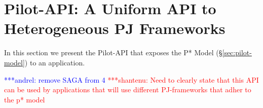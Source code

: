 \documentclass[conference,final]{IEEEtran}
\newcommand{\terminology}[1]{ {\textcolor{red} {(Terminology used: \textbf{#1}) }}}
\newcommand{\jhanote}[1]{ {\textcolor{red} { ***shantenu: #1 }}}
\newcommand{\alnote}[1]{ {\textcolor{blue} { ***andrel: #1 }}}
\newcommand{\amnote}[1]{ {\textcolor{blue} { ***andrem: #1 }}}
\newcommand{\msnote}[1]{ {\textcolor{cyan} { ***mark: #1 }}}
\newcommand{\note}[1]{ {\textcolor{magenta} { ***Note: #1 }}}
\newcommand{\terminology}[1]{}
\newcommand{\alnote}[1]{}
\newcommand{\amnote}[1]{}
\newcommand{\jhanote}[1]{}
\newcommand{\msnote}[1]{}
\newcommand{\note}[1]{}
\newcommand{\cu}{CU\xspace}
\newcommand{\upp}{\vspace*{-0.5em}}
\begin{document}
\upp

\section{Pilot-API:  A Uniform API to Heterogeneous PJ Frameworks}

 






In this section we present the  Pilot-API that
exposes the P* Model (\S\ref{sec:pilot-model}) to an application.

\alnote{remove SAGA from 4} \jhanote{Need to clearly state that this
  API can be used by applications that will use different
  PJ-frameworks that adher to the p* model}


\end{document}
